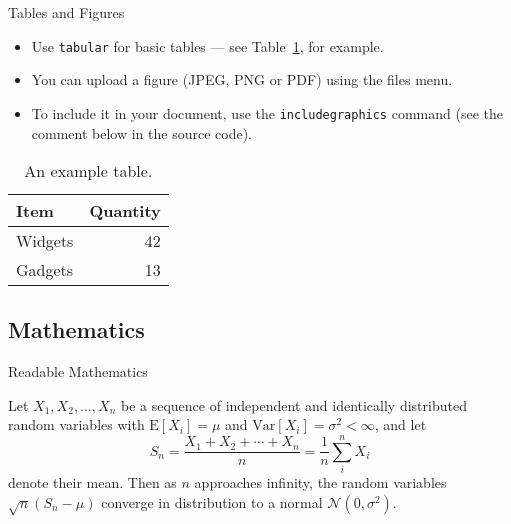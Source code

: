 \documentclass[aspectratio=169, t]{beamer}
\begin{document}
\begin{frame}{Tables and Figures}

\begin{itemize}
\pause \item Use \texttt{tabular} for \alert<2-4>{basic} tables --- see Table~\ref{tab:widgets}, for example.
\pause \item You can upload a figure (JPEG, PNG or PDF) using the files menu. 
\pause \item To include it in your document, use the \texttt{includegraphics} command (see the comment below in the source code).
\end{itemize}


\begin{table}
\centering
\begin{tabular}{l|r}
Item & Quantity \\\hline
Widgets & 42 \\
Gadgets & 13
\end{tabular}
\caption{\label{tab:widgets}An example table.}
\end{table}

\end{frame}

\subsection{Mathematics}

\begin{frame}{Readable Mathematics}

Let $X_1, X_2, \ldots, X_n$ be a sequence of independent and identically distributed random variables with $\text{E}[X_i] = \mu$ and $\text{Var}[X_i] = \sigma^2 < \infty$, and let
$$S_n = \frac{X_1 + X_2 + \cdots + X_n}{n}
      = \frac{1}{n}\sum_{i}^{n} X_i$$
denote their mean. Then as $n$ approaches infinity, the random variables $\sqrt{n}(S_n - \mu)$ converge in distribution to a normal $\mathcal{N}(0, \sigma^2)$.

\end{frame}
\end{document}
